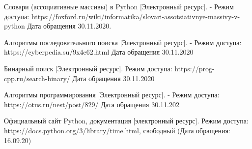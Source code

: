 \documentclass[12pt]{report}
\begin{document}
\begin{thebibliography}{2}
	
	 Словари (ассоциативные массивы) в Python [Электронный ресурс]. - Режим доступа: https://foxford.ru/wiki/informatika/slovari-assotsiativnye-massivy-v-python Дата обращения 30.11.2020.
	
	 Алгоритмы последовательного поиска [Электронный ресурс]. - Режим доступа: https://cyberpedia.su/9x4e62.html Дата обращения 30.11.2020
	
	 Бинарный поиск [Электронный ресурс]. Режим доступа: https://prog-cpp.ru/search-binary/ Дата обращения 30.11.2020
	
	 Алгоритмы программирования [Электронный ресурс]. - Режим доступа: https://otus.ru/nest/post/829/ Дата обращения 30.11.202
	
	 Официальный сайт Python, документация [электронный ресурс]. Режим доступа: https://docs.python.org/3/library/time.html, свободный (Дата обращения: 16.09.20)
	
\end{thebibliography}
\end{document}

